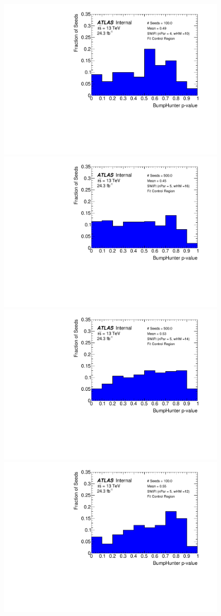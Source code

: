 \begin{figure}[!htb]
{}\hspace{-3mm}                                       
 {                                                    
  \includegraphics[width=0.32\linewidth, angle=0]{figs/Dibjet/LowMass/FitStudy_min566/pVal_bumpHunter_corrFitCR_4para_low10_high10.pdf}
}\hspace{-3mm}                                       
 {                                                    
  \includegraphics[width=0.32\linewidth, angle=0]{figs/Dibjet/LowMass/FitStudy_min566/pVal_bumpHunter_corrFitCR_5para_low16_high16.pdf}
}\hspace{-3mm}                                       
 {                                                    
  \includegraphics[width=0.32\linewidth, angle=0]{figs/Dibjet/LowMass/FitStudy_min566/pVal_bumpHunter_corrFitCR_5para_low14_high14.pdf}
}\hspace{-3mm}                                       
 {                                                    
  \includegraphics[width=0.32\linewidth, angle=0]{figs/Dibjet/LowMass/FitStudy_min566/pVal_bumpHunter_corrFitCR_5para_low12_high12.pdf}
}
\end{figure}
